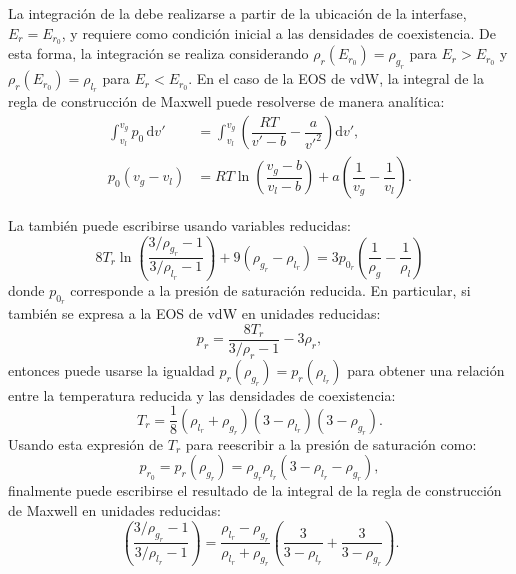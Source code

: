 La integraci\'on de la  debe realizarse a partir de la ubicaci\'on de la interfase, $E_r = E_{r_0}$, y requiere como condici\'on inicial a las densidades de coexistencia. De esta forma, la integraci\'on se realiza considerando $\rho_r(E_{r_0}) = \rho_{g_r}$ para $E_r > E_{r_0}$ y $\rho_r(E_{r_0}) = \rho_{l_r}$ para $E_r < E_{r_0}$. En el caso de la EOS de vdW, la integral de la regla de construcci\'on de Maxwell puede resolverse de manera anal\'itica:
\begin{equation}
	\begin{aligned}
	\int_{v_l}^{v_g} p_0 \, \mbox{d}v' &= \int_{v_l}^{v_g} \left( \dfrac{RT}{v'-b} - \dfrac{a}{v'^2} \right) \mbox{d}v', \\
		p_0(v_g-v_l) &= RT \ln \left( \dfrac{v_g - b}{v_l-b} \right) + a\left( \dfrac{1}{v_g} - \dfrac{1}{v_l} \right).
	\end{aligned}
	\label{eq:vdw_maxwell_analitica}
\end{equation}

La  tambi\'en puede escribirse usando variables reducidas:
\begin{equation}
	8T_r \ln \left( \dfrac{3/\rho_{g_r}-1}{3/\rho_{l_r}-1} \right) + 9(\rho_{g_r} - \rho_{l_r}) = 3p_{0_r} \left( \dfrac{1}{\rho_g} - \dfrac{1}{\rho_l} \right)
\end{equation}
donde $p_{0_r}$ corresponde a la presi\'on de saturaci\'on reducida. En particular, si tambi\'en se expresa a la EOS de vdW en unidades reducidas:
\begin{equation}
 p_r = \dfrac{8 T_r}{3/\rho_r-1} - 3\rho_r,
\end{equation}
entonces puede usarse la igualdad $p_r(\rho_{g_r}) = p_r(\rho_{l_r})$ para obtener una relaci\'on entre la temperatura reducida y las densidades de coexistencia:
\begin{equation}
	T_r = \dfrac{1}{8}(\rho_{l_r}+\rho_{g_r})(3-\rho_{l_r})(3-\rho_{g_r}).
	\label{eq:tr_maxwell}
\end{equation}
Usando esta expresi\'on de $T_r$ para reescribir a la presi\'on de saturaci\'on como:
\begin{equation}
	p_{r_0} = p_r(\rho_{g_r}) = \rho_{g_r} \rho_{l_r} ( 3 - \rho_{l_r} - \rho_{g_r} ),
\end{equation}
finalmente puede escribirse el resultado de la integral de la regla de construcci\'on de Maxwell en unidades reducidas:
\begin{equation}
	\left( \dfrac{3/\rho_{g_r}-1}{3/\rho_{l_r}-1} \right) = \dfrac{\rho_{l_r} - \rho_{g_r}}{\rho_{l_r} + \rho_{g_r}}\left( \dfrac{3}{3-\rho_{l_r}} + \dfrac{3}{3-\rho_{g_r}} \right).
	\label{eq:rhor_maxwell}
\end{equation}

